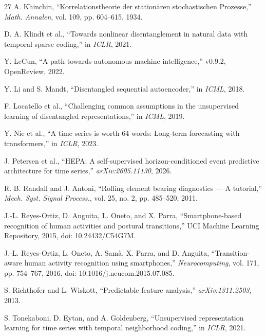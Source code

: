 \documentclass{article}
\begin{document}
\begin{thebibliography}{27}
 A. Khinchin, ``Korrelationstheorie der station\"{a}ren stochastischen Prozesse,'' \emph{Math. Annalen}, vol. 109, pp. 604--615, 1934.

 D. A. Klindt et al., ``Towards nonlinear disentanglement in natural data with temporal sparse coding,'' in \emph{ICLR}, 2021.

 Y. LeCun, ``A path towards autonomous machine intelligence,'' v0.9.2, OpenReview, 2022.

 Y. Li and S. Mandt, ``Disentangled sequential autoencoder,'' in \emph{ICML}, 2018.

 F. Locatello et al., ``Challenging common assumptions in the unsupervised learning of disentangled representations,'' in \emph{ICML}, 2019.

 Y. Nie et al., ``A time series is worth 64 words: Long-term forecasting with transformers,'' in \emph{ICLR}, 2023.

 J. Petersen et al., ``HEPA: A self-supervised horizon-conditioned event predictive architecture for time series,'' \emph{arXiv:2605.11130}, 2026.

 R. B. Randall and J. Antoni, ``Rolling element bearing diagnostics --- A tutorial,'' \emph{Mech. Syst. Signal Process.}, vol. 25, no. 2, pp. 485--520, 2011.

 J.-L. Reyes-Ortiz, D. Anguita, L. Oneto, and X. Parra, ``Smartphone-based recognition of human activities and postural transitions,'' UCI Machine Learning Repository, 2015, doi: 10.24432/C54G7M.

 J.-L. Reyes-Ortiz, L. Oneto, A. Sam\`{a}, X. Parra, and D. Anguita, ``Transition-aware human activity recognition using smartphones,'' \emph{Neurocomputing}, vol. 171, pp. 754--767, 2016, doi: 10.1016/j.neucom.2015.07.085.

 S. Richthofer and L. Wiskott, ``Predictable feature analysis,'' \emph{arXiv:1311.2503}, 2013.

 S. Tonekaboni, D. Eytan, and A. Goldenberg, ``Unsupervised representation learning for time series with temporal neighborhood coding,'' in \emph{ICLR}, 2021.


\end{thebibliography}
\end{document}
